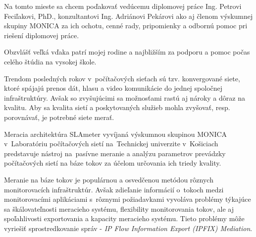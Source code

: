 \documentclass[]{tukediphc}
\begin{document}
\renewcommand\theHfigure{\theHsection.\arabic{figure}}
\renewcommand\theHtable{\theHsection.\arabic{table}}





\prvastrana

\titulnastrana

\abstraktsk %

\clearpage
\abstrakteng %

\kabstrakt %

 

\cestnevyhlasenie

\podakovanie
Na tomto mieste sa chcem poďakovať vedúcemu diplomovej práce Ing. Petrovi 
Feciľakovi, PhD., konzultantovi Ing. Adriánovi Pekárovi ako aj členom 
výskumnej skupiny MONICA za ich ochotu, cenné
rady, pripomienky a odbornú pomoc pri riešení diplomovej práce.

Obzvlášť veľká vďaka patrí mojej rodine a najbližším za podporu a pomoc 
počas celého štúdia na vysokej škole.
\kpodakovania

\predhovor

Trendom posledných rokov v~počítačových sieťach sú tzv. konvergované siete, ktoré spájajú prenos dát, 
hlasu a video komunikácie do jednej spoločnej infraštruktúry. Avšak so zvyšujúcimi sa možnosťami rastú 
aj nároky a dôraz na kvalitu. Aby sa kvalita sietí a poskytovaných služieb mohla zvyšovať, resp. 
porovnávať, je potrebné siete merať.

Meracia architektúra SLAmeter vyvíjaná výskumnou skupinou MONICA v~Laboratóriu počítačových sietí 
na~Technickej univerzite v~Košiciach predstavuje nástroj na~pasívne meranie a analýzu parametrov prevádzky
počítačových sietí na báze tokov za účelom určovania ich triedy kvality.

Meranie na báze tokov je populárnou a osvedčenou metódou rôznych monitorovacích infraštruktúr. Avšak 
zdieľanie informácií o~tokoch medzi monitorovacími aplikáciami s~rôznymi požiadavkami vyvoláva problémy 
týkajúce sa škálovateľnosti meracieho systému, flexibility monitorovania tokov, ale aj spoľahlivosti 
exportovania a kapacity meracieho systému. Tieto problémy môže vyriešiť sprostredkovanie správ -
\emph{IP Flow Information Export (IPFIX) Mediation}.
\end{document}
